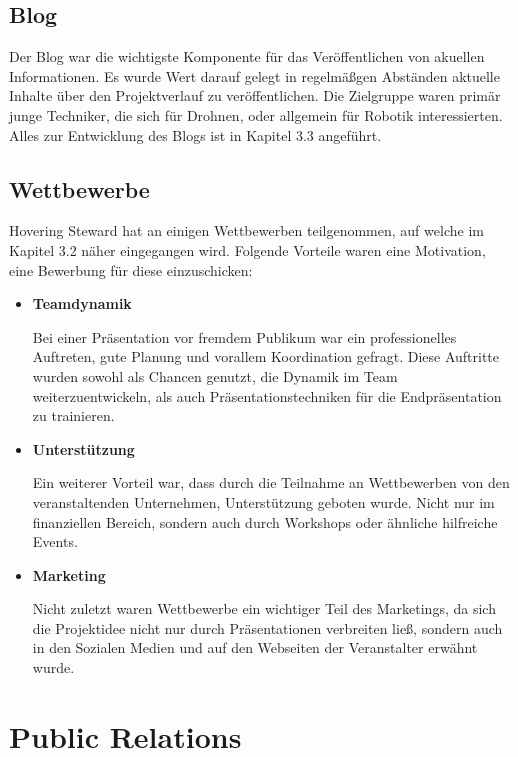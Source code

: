     \subsection*{Blog}
    Der Blog war die wichtigste Komponente für das Veröffentlichen von akuellen Informationen. Es wurde Wert darauf gelegt
    in regelmäßgen Abständen aktuelle Inhalte über den Projektverlauf zu veröffentlichen. Die Zielgruppe waren primär junge Techniker,
    die sich für Drohnen, oder allgemein für Robotik interessierten. Alles zur Entwicklung des Blogs ist in Kapitel 3.3 angeführt.

    \subsection*{Wettbewerbe}
    Hovering Steward hat an einigen Wettbewerben teilgenommen, auf welche im Kapitel 3.2 näher eingegangen wird.
    Folgende Vorteile waren eine Motivation, eine Bewerbung für diese einzuschicken:

    \begin{itemize}
      \item \textbf{Teamdynamik}

      Bei einer Präsentation vor fremdem Publikum war ein professionelles Auftreten, gute Planung und vorallem Koordination gefragt.
      Diese Auftritte wurden sowohl als Chancen genutzt, die Dynamik im Team weiterzuentwickeln, als auch Präsentationstechniken für
      die Endpräsentation zu trainieren.

      \item \textbf{Unterstützung}

      Ein weiterer Vorteil war, dass durch die Teilnahme an Wettbewerben von den veranstaltenden Unternehmen, Unterstützung geboten wurde. Nicht nur im finanziellen
      Bereich, sondern auch durch Workshops oder ähnliche hilfreiche Events.

      \item \textbf{Marketing}

      Nicht zuletzt waren Wettbewerbe ein wichtiger Teil des Marketings, da sich die Projektidee nicht nur durch Präsentationen verbreiten ließ,
      sondern auch in den Sozialen Medien und auf den Webseiten der Veranstalter erwähnt wurde.

    \end{itemize}


\section{Public Relations}

